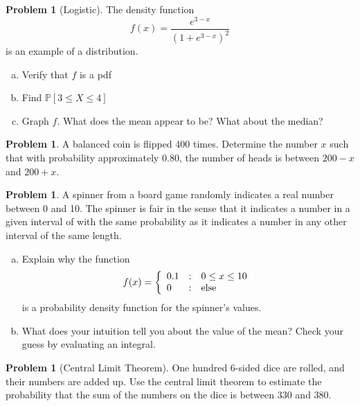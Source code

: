\documentclass[10pt]{article}
\theoremstyle{definition}
\newtheorem{problem}[theorem]{Problem}
\newcommand{\1}[1]{\textbf{1}_{\left[#1\right]}} %
\def\P{\mathbb{P}} %
\newcommand{\dempfcolor}[1]{{\color{RoyalBlue}#1}}
\newcommand{\demph}[1]{\dempfcolor{{\sl #1}}}
\begin{document}
\begin{problem}[Logistic]
  The density function
  \begin{equation*}
    f(x) = \frac{e^{3-x}}{(1+e^{3-x})^{2}}
  \end{equation*}
  is an example of a \demph{logistic} distribution.
  \begin{enumerate}[(a)]
    \item Verify that $f$ is a pdf
    \item Find $\P\left[3 \leq X \leq 4\right]$
    \item Graph $f$. What does the mean appear to be? What about the median?
  \end{enumerate}
\end{problem}



\begin{problem}
  A balanced coin is flipped 400 times. Determine the number $x$ such that
  with probability approximately 0.80, the number of heads is between $200-x$
  and $200+x$.
\end{problem}


\begin{problem}
  A spinner from a board game randomly indicates a real number between 0 and
  10. The spinner is fair in the sense that it indicates a number in a given
  interval of with the same probability as it indicates a number in any other
  interval of the same length.
  \begin{enumerate}[(a)]
    \item Explain why the function
    \begin{equation*}
      f(x) = \left\{ \begin{array}{l@{\quad:\quad}l} 0.1 & 0 \leq x \leq 10\\
          0& \text{else}\end{array}\right.
    \end{equation*}
    is a probability density function for the spinner's values.
    \item What does your intuition tell you about the value of the mean? Check
    your guess by evaluating an integral.
  \end{enumerate}
\end{problem}



\begin{problem}[Central Limit Theorem]
  One hundred $6$-sided dice are rolled, and their numbers are added up. Use
  the central limit theorem to estimate the probability that the sum of the
  numbers on the dice is between $330$ and $380$.
\end{problem}
\end{document}
